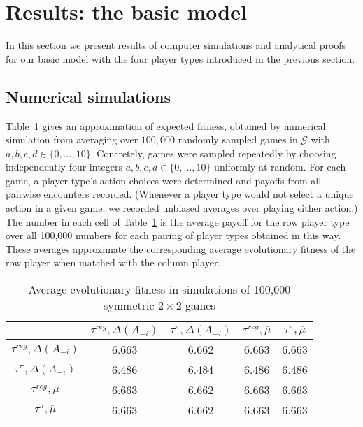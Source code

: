 \documentclass[fleqn,reqno,11pt]{article}
\begin{document}
\section{Results: the basic model}
\label{sec:results:-basic-model}


In this section we present results of computer simulations and analytical proofs for our basic
model with the four player types introduced in the previous section. 

\subsection{Numerical simulations}
\label{sec:numer-simul}

Table~\ref{tab:ExpectedFitness_4Types} gives an approximation of expected fitness, obtained by
numerical simulation from averaging over $100,000$ randomly sampled games in $\mathcal{G}$ with
$a,b,c,d \in \lbrace 0, \dots, 10 \rbrace$. Concretely, games were sampled repeatedly by
choosing independently four integers $a,b,c,d \in \lbrace 0, \dots, 10 \rbrace$ uniformly at
random. For each game, a player type's action choices were determined and payoffs from all
pairwise encounters recorded. (Whenever a player type would not select a unique action in a
given game, we recorded unbiased averages over playing either action.) The number in each cell
of Table~\ref{tab:ExpectedFitness_4Types} is the average payoff for the row player type over
all 100,000 numbers for each pairing of player types obtained in this way. These averages
approximate the corresponding average evolutionary fitness of the row player when matched with
the column player.

\begin{table}[t]
\centering
\begin{tabular}{ccccc}
  \toprule
 & $\tau^{reg}, \Delta(A_{-i})$ 
 & $\tau^{\pi}, \Delta(A_{-i})$ 
 & $\tau^{reg}, \overline{\mu}$ 
 & $\tau^{\pi}, \overline{\mu}$ \\ 
  \midrule
  $\tau^{reg}, \Delta(A_{-i})$ & 6.663 & 6.662 & 6.663 & 6.663 \\ 
  $\tau^{\pi}, \Delta(A_{-i})$ & 6.486 & 6.484 & 6.486 & 6.486 \\ 
  $\tau^{reg}, \overline{\mu}$ & 6.663 & 6.662 & 6.663 & 6.663 \\  
  $\tau^{\pi}, \overline{\mu}$ & 6.663 & 6.662 & 6.663 & 6.663 \\ 
   \bottomrule
\end{tabular}                    
\caption{Average evolutionary fitness in simulations of 100,000 symmetric $2 \times 2$ games}
\label{tab:ExpectedFitness_4Types}
\end{table}
\end{document}
